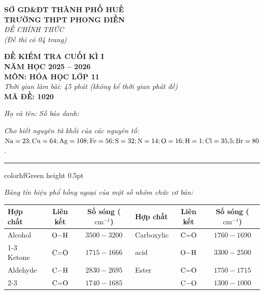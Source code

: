 \documentclass[11pt,a4paper]{article}
\begin{document}
\begin{minipage}[t]{0.48\textwidth}
\textbf{SỞ GD\&ĐT THÀNH PHỐ HUẾ}\\
\textbf{TRƯỜNG THPT PHONG ĐIỀN}\\
\textit{ĐỀ CHÍNH THỨC}\\
\textit{(Đề thi có 04 trang)}
\end{minipage}
\hfill
\begin{minipage}[t]{0.48\textwidth}
\raggedleft
\textbf{\color{hfRed}ĐỀ KIỂM TRA CUỐI KÌ I}\\
\textbf{NĂM HỌC 2025 -- 2026}\\
\textbf{MÔN: HÓA HỌC LỚP 11}\\
\textit{Thời gian làm bài: 45 phút (không kể thời gian phát đề)}\\
\textbf{MÃ ĐỀ: 1020}
\end{minipage}

\vspace{4pt}
\noindent
\textit{Họ và tên:} \dotfill \textit{Số báo danh:} \dotfill

\vspace{3pt}
\noindent
\textit{\footnotesize Cho biết nguyên tử khối của các nguyên tố: $\ce{Na} = 23; \ce{Cu} = 64; \ce{Ag} = 108; \ce{Fe} = 56; \ce{S} = 32; \ce{N} = 14; \ce{O} = 16; \ce{H} = 1; \ce{Cl} = 35{,}5; \ce{Br} = 80$.}

\vspace{3pt}
\hrule color{hfGreen} height 0.5pt

\vspace{4pt}
\textit{\small Bảng tín hiệu phổ hồng ngoại của một số nhóm chức cơ bản:}
\begin{center}
\small
\renewcommand{\arraystretch}{1.15}
\begin{tabular}{|l|c|c||l|c|c|}
\hline
\rowcolor{tableGreen}
\textbf{Hợp chất} & \textbf{Liên kết} & \textbf{Số sóng ($\text{cm}^{-1}$)} & \textbf{Hợp chất} & \textbf{Liên kết} & \textbf{Số sóng ($\text{cm}^{-1}$)} \\ \hline
Alcohol & $\ce{O-H}$ & $3500 - 3200$ & Carboxylic & $\ce{C=O}$ & $1760 - 1690$ \\ \cline{1-3}
Ketone & $\ce{C=O}$ & $1715 - 1666$ & acid & $\ce{O-H}$ & $3300 - 2500$ \\ \hline
Aldehyde & $\ce{C-H}$ & $2830 - 2695$ & Ester & $\ce{C=O}$ & $1750 - 1715$ \\ \cline{2-3} \cline{5-6}
& $\ce{C=O}$ & $1740 - 1685$ & & $\ce{C-O}$ & $1300 - 1000$ \\ \hline
\end{tabular}
\end{center}
\end{document}
